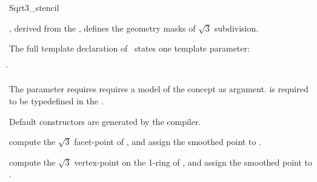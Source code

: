 \begin{ccRefClass}{Sqrt3_stencil}

\ccDefinition

\ccClassTemplateName , derived from the , 
defines the geometry masks of $\sqrt{3}$ subdivision. 


\ccParameters

The full template declaration of \ccClassTemplateName\ states one
template parameter:

\begin{tabbing}
 \=\\
\end{tabbing}
   
The  parameter requires requires a model of 
the  concept as argument. 
 is required to be typedefined in the 
.

\ccCreation

Default constructors are generated by the compiler.

\ccThree{}{}{}

{compute the $\sqrt{3}$ facet-point of , and assign 
the smoothed point to .}

{compute the $\sqrt{3}$ vertex-point on the 1-ring of , 
and assign the smoothed point to .}


\ccSeeAlso

\\
\\
\\

\end{ccRefClass}

\ccRefPageEnd


